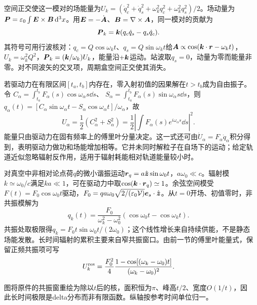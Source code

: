 空间正交使这一模对的场能量为$U_k=(\dot q_c^2+\dot q_s^2+\omega_k^2q_c^2+\omega_k^2q_s^2)/2$。场动量为$\boldsymbol{P}=\varepsilon_0\int\boldsymbol{E}\times\boldsymbol{B}\,\mathrm d^3x$。用$\boldsymbol{E}=-\dot{\boldsymbol{A}}$、$\boldsymbol{B}=\nabla\times\boldsymbol{A}$，同一模对的贡献为
\[
 \boldsymbol{P}_k=\boldsymbol{k}(q_c\dot q_s-q_s\dot q_c).
\]
其符号可用行波核对：$q_c=Q\cos\omega_kt$、$q_s=Q\sin\omega_kt$给$\boldsymbol{A}\propto\cos(\boldsymbol{k}\cdot\boldsymbol{r}-\omega_kt)$，$U_k=\omega_k^2Q^2$，$\boldsymbol{P}_k=(\boldsymbol{k}/\omega_k)U_k$，能量沿$+\boldsymbol{k}$运动。站波取$q_s=0$，动量为零而能量非零。对不同波矢的交叉项，周期盒空间正交使其消失。

若驱动力在有限区间$[t_a,t_b]$内存在，零入射初值的因果解在$t>t_b$成为自由振子。令
$C_\alpha=\int_{t_a}^{t_b}F_\alpha(s)\cos\omega_\alpha s\dd s$、
$S_\alpha=\int_{t_a}^{t_b}F_\alpha(s)\sin\omega_\alpha s\dd s$，则
$q_\alpha(t)=[C_\alpha\sin\omega_\alpha t-S_\alpha\cos\omega_\alpha t]/\omega_\alpha$，故
\[
 U_\alpha=\frac12(C_\alpha^2+S_\alpha^2)
 =\frac12\left|\int F_\alpha(s)e^{i\omega_\alpha s}\dd s\right|^2.
\]
能量只由驱动力在固有频率上的傅里叶分量决定。这一式还可由$\dot U_\alpha=F_\alpha\dot q_\alpha$积分得到，表明驱动力做功和场能增加相等。它并未同时解粒子在自场下的运动；给定轨道近似忽略辐射反作用，适用于辐射耗能相对轨道能量较小时。

对真空中非相对论点荷$q$的微小谐振运动$\boldsymbol{r}_q=a\hat{\boldsymbol{z}}\sin\omega_0t$，$a\omega_0\ll c$。辐射模$k\simeq\omega_0/c$满足$ka\ll1$，可在驱动力中取$\cos(\boldsymbol{k}\cdot\boldsymbol{r}_q)\simeq1$。余弦空间模受
$F(t)=F_0\cos\omega_0t$驱动，$F_0=qa\omega_0\sqrt{2/(\varepsilon_0\mathcal V)}\boldsymbol{e}_s\cdot\hat{\boldsymbol{z}}$。从$t=0$开场、初值零时，非共振模解为
\[
 q_k(t)=\frac{F_0}{\omega_k^2-\omega_0^2}
 (\cos\omega_0t-\cos\omega_kt).
\]
共振处取极限得$q_k=F_0t\sin\omega_0t/(2\omega_0)$；这个线性增长来自持续供能，不是静态场能发散。长时间辐射的累积主要来自窄共振窗口。由前一节的傅里叶能量式，保留正频共振项可写
\[
 U_k^{\rm res}=\frac{F_0^2}{4}
 \frac{1-\cos[(\omega_k-\omega_0)t]}{(\omega_k-\omega_0)^2}.
\]
\begin{center}
\end{center}
图将原件的共振窗重绘为除以$t$后的核，面积恒为$\pi$、峰高$t/2$、宽度$O(1/t)$，因此长时间极限是delta分布而非有限函数。纵轴按参考时间单位归一。

